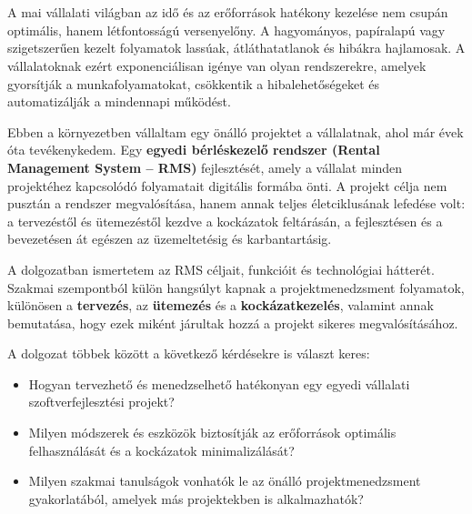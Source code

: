 \chapter{\bevezetes}

A mai vállalati világban az idő és az erőforrások hatékony kezelése nem csupán optimális, hanem létfontosságú versenyelőny. 
A hagyományos, papíralapú vagy szigetszerűen kezelt folyamatok lassúak, átláthatatlanok és hibákra hajlamosak. 
A vállalatoknak ezért exponenciálisan igénye van olyan rendszerekre, amelyek gyorsítják a munkafolyamatokat, csökkentik 
a hibalehetőségeket és automatizálják a mindennapi működést.

Ebben a környezetben vállaltam egy önálló projektet a vállalatnak, ahol már évek óta tevékenykedem.
Egy \textbf{egyedi bérléskezelő rendszer (Rental Management System – RMS)} fejlesztését, 
amely a vállalat minden projektéhez kapcsolódó folyamatait digitális formába önti. 
A projekt célja nem pusztán a rendszer megvalósítása, hanem annak teljes életciklusának lefedése volt: a tervezéstől és ütemezéstől kezdve a kockázatok feltárásán, 
a fejlesztésen és a bevezetésen át egészen az üzemeltetésig és karbantartásig.

A dolgozatban ismertetem az RMS céljait, funkcióit és technológiai hátterét. 
Szakmai szempontból külön hangsúlyt kapnak a projektmenedzsment folyamatok, 
különösen a \textbf{tervezés}, az \textbf{ütemezés} és a \textbf{kockázatkezelés}, valamint annak bemutatása, 
hogy ezek miként járultak hozzá a projekt sikeres megvalósításához.

\vspace{1em}
\noindent A dolgozat többek között a következő kérdésekre is választ keres:
\begin{itemize}
    \item Hogyan tervezhető és menedzselhető hatékonyan egy egyedi vállalati szoftverfejlesztési projekt?
    \item Milyen módszerek és eszközök biztosítják az erőforrások optimális felhasználását és a kockázatok minimalizálását?
    \item Milyen szakmai tanulságok vonhatók le az önálló projektmenedzsment gyakorlatából, amelyek más projektekben is alkalmazhatók?
\end{itemize}

